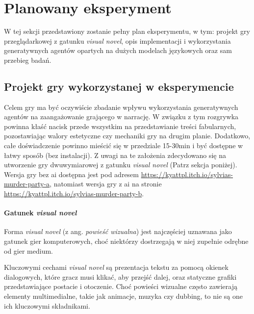 \graphicspath{{chapters/chapter6/imgs/}}

\chapter{Planowany eksperyment}\label{chapter:ch6}

W tej sekcji przedstawiony zostanie pełny plan eksperymentu, w tym: projekt gry przeglądarkowej
z gatunku \textit{visual novel}, opis implementacji i wykorzystania generatywnych agentów
opartych na dużych modelach językowych oraz sam przebieg badań.

\section{Projekt gry wykorzystanej w eksperymencie}\label{section:ch6_1}

Celem gry ma być oczywiście zbadanie wpływu wykorzystania generatywnych agentów na zaangażowanie
grającego w narrację. W związku z tym rozgrywka powinna kłaść nacisk przede wszystkim na
przedstawianie treści fabularnych, pozostawiając walory estetyczne czy mechaniki gry na drugim
planie. Dodatkowo, całe doświadczenie powinno mieścić się w przedziale 15-30min i być dostępne
w łatwy sposób (bez instalacji). Z uwagi na te założenia zdecydowano się na utworzenie gry
dwuwymiarowej z gatunku \textit{visual novel} (Patrz sekcja poniżej). Wersja gry bez \gls{ai}
dostępna jest pod adresem \href{https://kyattpl.itch.io/sylvias-murder-party-a}{https://kyattpl.itch.io/sylvias-murder-party-a},
natomiast wersja gry z \gls{ai} na stronie \href{https://kyattpl.itch.io/sylvias-murder-party-b}{https://kyattpl.itch.io/sylvias-murder-party-b}.

\subsubsection*{Gatunek \textit{visual novel}}\label{subsubsection:ch6_1_1}

Forma \textit{visual novel} (z ang. \textit{powieść wizualna}) jest najczęściej uznawana jako
gatunek gier komputerowych, choć niektórzy dostrzegają w niej zupełnie odrębne od gier
medium\cite{tvtropes_visual_novel}.

Kluczowymi cechami \textit{visual novel} są prezentacja tekstu za pomocą okienek dialogowych, które gracz
musi klikać, aby przejść dalej, oraz statyczne grafiki przedstawiające postacie i otoczenie. Choć
powieści wizualne często zawierają elementy multimedialne, takie jak animacje, muzyka czy dubbing,
to nie są one ich kluczowymi składnikami\cite{tvtropes_visual_novel}.

